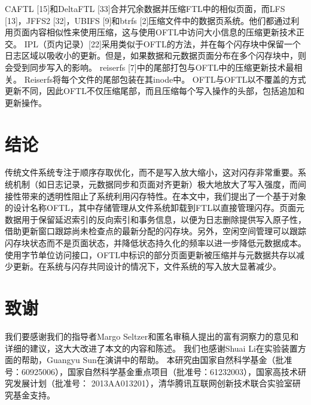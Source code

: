 CAFTL [15]和DeltaFTL [33]合并冗余数据并压缩FTL中的相似页面，而LFS [13]，JFFS2 [32]，UBIFS [9]和btrfs [2]压缩文件中的数据页系统。他们都通过利用页面内容相似性来使用压缩，这与使用OFTL中访问大小信息的压缩更新技术正交。 IPL（页内记录）[22]采用类似于OFTL的方法，并在每个闪存块中保留一个日志区域以吸收小的更新。但是，如果数据和元数据页面分布在多个闪存块中，则会受到同步写入的影响。 reiserfs [7]中的尾部打包与OFTL中的压缩更新技术最相关。 Reiserfs将每个文件的尾部包装在其inode中。 OFTL与OFTL以不覆盖的方式更新不同，因此OFTL不仅压缩尾部，而且压缩每个写入操作的头部，包括追加和更新操作。

\section{结论}
传统文件系统专注于顺序存取优化，而不是写入放大缩小，这对闪存非常重要。系统机制（如日志记录，元数据同步和页面对齐更新）极大地放大了写入强度，而间接性带来的透明性阻止了系统利用闪存特性。在本文中，我们提出了一个基于对象的设计名称OFTL，其中存储管理从文件系统卸载到FTL以直接管理闪存。页面元数据用于保留延迟索引的反向索引和事务信息，以便为日志删除提供写入原子性，借助更新窗口跟踪尚未检查点的最新分配的闪存块。另外，空闲空间管理可以跟踪闪存块状态而不是页面状态，并降低状态持久化的频率以进一步降低元数据成本。使用字节单位访问接口，OFTL中标识的部分页面更新被压缩并与元数据共存以减少更新。在系统与闪存共同设计的情况下，文件系统的写入放大显著减少。

\section*{致谢}
我们要感谢我们的指导者Margo Seltzer和匿名审稿人提出的富有洞察力的意见和详细的建议，这大大改进了本文的内容和陈述。 我们也感谢Shuai Li在实验装置方面的帮助，Guangyu Sun在演讲中的帮助。 本研究由国家自然科学基金（批准号：60925006），国家自然科学基金重点项目（批准号：61232003），国家高技术研究发展计划（批准号： 2013AA013201），清华腾讯互联网创新技术联合实验室研究基金支持。



